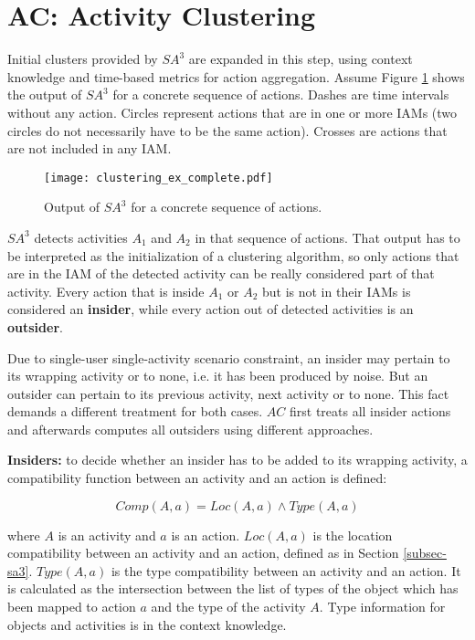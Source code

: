 \section{AC: Activity Clustering}
\label{sec:clustering:ac}

Initial clusters provided by $SA^3$ are expanded in this step, using context knowledge and time-based metrics for action aggregation. Assume Figure \ref{fig-initial-clusters} shows the output of $SA^3$ for a concrete sequence of actions. Dashes are time intervals without any action. Circles represent actions that are in one or more IAMs (two circles do not necessarily have to be the same action). Crosses are actions that are not included in any IAM. 

\begin{figure}[htbp]%
\centering
\texttt{[image: clustering\_ex\_complete.pdf]}
    \caption{Output of $SA^3$ for a concrete sequence of actions.}
    \label{fig-initial-clusters}
\end{figure}

$SA^3$ detects activities $A_1$ and $A_2$ in that sequence of actions. That output has to be interpreted as the initialization of a clustering algorithm, so only actions that are in the IAM of the detected activity can be really considered part of that activity. Every action that is inside $A_1$ or $A_2$ but is not in their IAMs is considered an \textbf{insider}, while every action out of detected activities is an \textbf{outsider}.

Due to single-user single-activity scenario constraint, an insider may pertain to its wrapping activity or to none, i.e. it has been produced by noise. But an outsider can pertain to its previous activity, next activity or to none. This fact demands a different treatment for both cases. $AC$ first treats all insider actions and afterwards computes all outsiders using different approaches.

\textbf{Insiders:} to decide whether an insider has to be added to its wrapping activity, a compatibility function between an activity and an action is defined:

\begin{equation}
 Comp(A, a) = Loc(A, a) \wedge Type(A, a)
\end{equation}

\noindent where $A$ is an activity and $a$ is an action. $Loc(A, a)$ is the location compatibility between an activity and an action, defined as in Section \ref{subsec-sa3}. $Type(A, a)$ is the type compatibility between an activity and an action. It is calculated as the intersection between the list of types of the object which has been mapped to action $a$ and the type of the activity $A$. Type information for objects and activities is in the context knowledge. 

